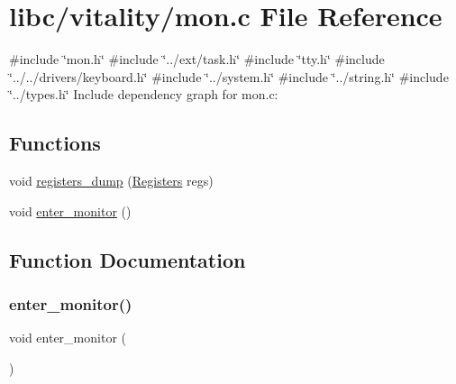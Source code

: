 \hypertarget{a00167}{}\section{libc/vitality/mon.c File Reference}
\label{a00167}
{\ttfamily \#include \char`\"{}mon.\+h\char`\"{}}\newline
{\ttfamily \#include \char`\"{}../ext/task.\+h\char`\"{}}\newline
{\ttfamily \#include \char`\"{}tty.\+h\char`\"{}}\newline
{\ttfamily \#include \char`\"{}../../drivers/keyboard.\+h\char`\"{}}\newline
{\ttfamily \#include \char`\"{}../system.\+h\char`\"{}}\newline
{\ttfamily \#include \char`\"{}../string.\+h\char`\"{}}\newline
{\ttfamily \#include \char`\"{}../types.\+h\char`\"{}}\newline
Include dependency graph for mon.\+c\+:
\subsection*{Functions}
\begin{DoxyCompactItemize}
\item 
void \hyperlink{a00167_ac4a1734d665cf10e32ddb9ebebfd8169_ac4a1734d665cf10e32ddb9ebebfd8169}{registers\+\_\+dump} (\hyperlink{a00250}{Registers} regs)
\item 
void \hyperlink{a00167_a33b77c779213ba5f7a0381c995a06f62_a33b77c779213ba5f7a0381c995a06f62}{enter\+\_\+monitor} ()
\end{DoxyCompactItemize}


\subsection{Function Documentation}
\mbox{\label{a00167_a33b77c779213ba5f7a0381c995a06f62_a33b77c779213ba5f7a0381c995a06f62}} 
\subsubsection{\texorpdfstring{enter\+\_\+monitor()}{enter\_monitor()}}
{\footnotesize\ttfamily void enter\+\_\+monitor (\begin{DoxyParamCaption}{ }\end{DoxyParamCaption})}



